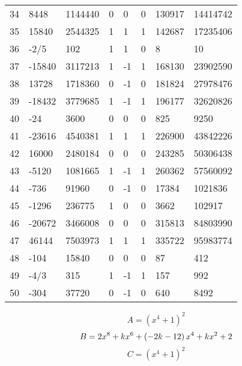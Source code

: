 \documentclass{amsart}
\begin{document}
\begin{longtable}{|l|l|l|lllll|}
34&8448&1144440&0&0&0&130917&14414742\\
35&15840&2544325&1&1&1&142687&17235406\\
36&-2/5&102&1&1&0&8&10\\
37&-15840&3117213&1&-1&1&168130&23902590\\
38&13728&1718360&0&-1&0&181824&27978476\\
39&-18432&3779685&1&-1&1&196177&32620826\\
40&-24&3600&0&0&0&825&9250\\
41&-23616&4540381&1&1&1&226900&43842226\\
42&16000&2480184&0&0&0&243285&50306438\\
43&-5120&1081665&1&-1&1&260362&57560092\\
44&-736&91960&0&-1&0&17384&1021836\\
45&-1296&236775&1&0&0&3662&102917\\
46&-20672&3466008&0&0&0&315813&84803990\\
47&46144&7503973&1&1&1&335722&95983774\\
48&-104&15840&0&0&0&87&412\\
49&-4/3&315&1&-1&1&157&992\\
50&-304&37720&0&-1&0&640&8492\\
\hline
\end{longtable}
$$A=(x^4
 + 1)^{2}$$
$$B=2\*x^8
 + k\*x^6
 + \left(-2\*k
 - 12\right) \*x^4
 + k\*x^2
 + 2$$
$$C=(x^4
 + 1)^{2}$$
\end{document}
